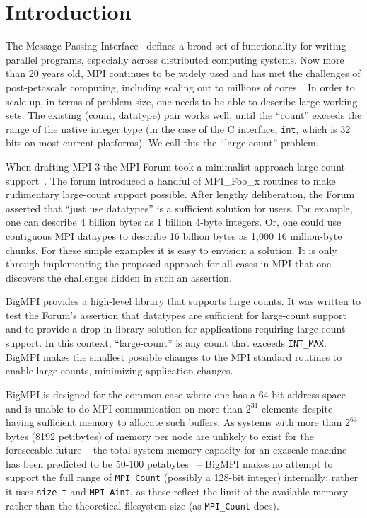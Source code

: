 
\section{Introduction}
\label{sec:intro}

The Message Passing Interface~\cite{mpiforum:94, mpiforum:96, mpiforum:09, mpiforum:12} 
defines a broad set of functionality for writing parallel programs, especially across
distributed computing systems.
Now more than 20 years old, MPI continues to be widely used and has met the challenges of
post-petascale computing, including scaling out to millions of cores~\cite{balaji2011mpi}. 
In order to scale up, in terms of problem size, one needs
to be able to describe large working sets.  The existing (count, datatype) pair
works well, until the ``count'' exceeds the range of the native integer type
(in the case of the C interface, \texttt{int}, which is 32 bits on most current platforms).
We call this the ``large-count'' problem.

When drafting MPI-3 the MPI Forum took a minimalist approach large-count 
support~\cite{squyres-blog-large-count,ticket265}.
The forum introduced a handful of MPI\_Foo\_x routines to make rudimentary
large-count support possible.  After lengthy deliberation, the
Forum asserted that ``just use datatypes'' is a sufficient solution for users.
For example, one can describe 4 billion bytes as 1 billion 4-byte integers.
Or, one could use contiguous MPI dataypes to describe 16 billion bytes as 1,000
16 million-byte chunks.  For these simple examples it is easy to envision a
solution. It is only through implementing the proposed approach for all cases
in MPI that one discovers the challenges hidden in such an assertion.

BigMPI provides a high-level library that supports large counts.
It was written to test the Forum's assertion
that datatypes are sufficient for large-count support and to provide a drop-in library
solution for applications requiring large-count support.
In this context, ``large-count'' is any count that exceeds \texttt{INT\_MAX}.
BigMPI makes the smallest possible changes to the MPI standard routines to
enable large counts, minimizing application changes.

BigMPI is designed for the common case where one has a 64-bit address
space and is unable to do MPI communication on more than $2^{31}$ elements
despite having sufficient memory to allocate such buffers.
As systems with more than $2^{63}$ bytes (8192 petibytes) of memory 
per node are unlikely to exist for the foreseeable future --
the total system memory capacity for an exascale machine has been 
predicted to be 50-100 petabytes~\cite{shalf2011exascale} --
BigMPI makes no attempt to support the full range of \texttt{MPI\_Count}
(possibly a 128-bit integer) internally; rather it uses \texttt{size\_t}
and \texttt{MPI\_Aint}, as these reflect the limit of the available memory
rather than the theoretical filesystem size (as \texttt{MPI\_Count} does).
